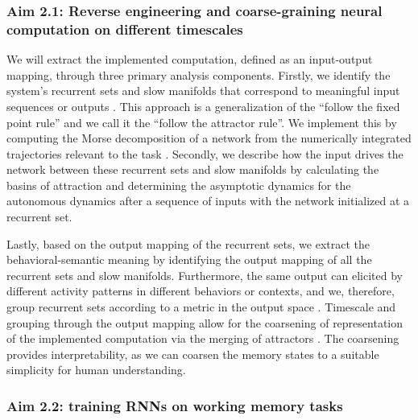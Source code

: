 \documentclass[12pt,letterpaper, onecolumn]{article}
\theoremstyle{definition}
\theoremstyle{remark}
\begin{document}
\subsubsection*{Aim 2.1: Reverse engineering and coarse-graining neural computation on different timescales}
We will extract the implemented computation, defined as an input-output mapping, through three primary analysis components.
Firstly, we identify the system's recurrent sets and slow manifolds that correspond to meaningful input sequences or outputs \citep{goudar2018}. This approach is a generalization of the ``follow the fixed point rule'' \citep{sussillo2013blackbox} and we call it the ``follow the attractor rule''.
We implement this by computing the Morse decomposition of a network from the numerically integrated trajectories relevant to the task \citep{mischaikow1999, arai2009database}.
Secondly, we describe how the input drives the network between these recurrent sets and slow manifolds by calculating the basins of attraction and determining the asymptotic dynamics for the autonomous dynamics after a sequence of inputs with the network initialized at a recurrent set. 


Lastly, based on the output mapping of the recurrent sets, we extract the behavioral-semantic meaning by identifying the output mapping of all the recurrent sets and slow manifolds. Furthermore, the same output can elicited by different activity patterns in different behaviors or contexts, and we, therefore, group recurrent sets according to a metric in the output space \citep{athalye2023, myers2022}.
Timescale and grouping through the output mapping allow for the coarsening of representation of the implemented computation via the merging of attractors \citep{braun2010}.
The coarsening provides interpretability, as we can coarsen the memory states to a suitable simplicity for human understanding.

%
\subsubsection*{Aim 2.2: training RNNs on working memory tasks}
\end{document}

